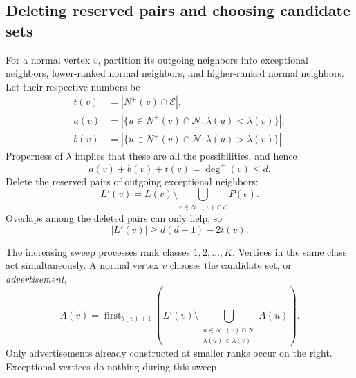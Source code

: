 \documentclass[11pt,a4paper]{article}
\numberwithin{equation}{section}
\newcommand{\Nout}{N^{+}}
\newcommand{\exc}{\mathcal E}
\newcommand{\normal}{\mathcal N}
\newcommand{\first}{\operatorname{first}}
\newcommand{\outdeg}{\deg^{+}}
\begin{document}
\subsection{Deleting reserved pairs and choosing candidate sets}

For a normal vertex \(v\), partition its outgoing neighbors into
exceptional neighbors, lower-ranked normal neighbors, and
higher-ranked normal neighbors. Let their respective numbers be
\begin{equation}
\begin{split}
 t(v)&=|\Nout(v)\cap\exc|,\\
 a(v)&=|\{u\in\Nout(v)\cap\normal:\lambda(u)<\lambda(v)\}|,\\
 b(v)&=|\{u\in\Nout(v)\cap\normal:\lambda(u)>\lambda(v)\}|.
\end{split}
\label{eq:counts}
\end{equation}
Properness of \(\lambda\) implies that these are all the possibilities,
and hence
\begin{equation}
 a(v)+b(v)+t(v)=\outdeg(v)\leq d.
 \label{eq:budget}
\end{equation}
Delete the reserved pairs of outgoing exceptional neighbors:
\begin{equation}
 L'(v)=L(v)\setminus
           \bigcup_{e\in\Nout(v)\cap\exc}P(e).
 \label{eq:deleted}
\end{equation}
Overlaps among the deleted pairs can only help, so
\begin{equation}
 |L'(v)|\geq d(d+1)-2t(v).
 \label{eq:deletionbound}
\end{equation}

The increasing sweep processes rank classes \(1,2,\ldots,K\).
Vertices in the same class act simultaneously. A normal vertex \(v\)
chooses the candidate set, or \emph{advertisement},
\begin{equation}
 A(v)=\first_{b(v)+1}
 \left(
 L'(v)\setminus
 \bigcup_{\substack{u\in\Nout(v)\cap\normal\\
                   \lambda(u)<\lambda(v)}} A(u)
 \right).
 \label{eq:advertisement}
\end{equation}
Only advertisements already constructed at smaller ranks occur on
the right. Exceptional vertices do nothing during this sweep.
\end{document}
